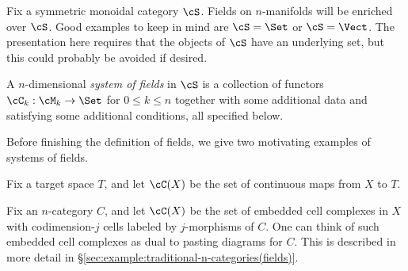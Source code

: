 Fix a symmetric monoidal category $\cS$.
Fields on $n$-manifolds will be enriched over $\cS$.
Good examples to keep in mind are $\cS = \Set$ or $\cS = \Vect$.
The presentation here requires that the objects of $\cS$ have an underlying set, 
but this could probably be avoided if desired.

A $n$-dimensional {\it system of fields} in $\cS$
is a collection of functors $\cC_k : \cM_k \to \Set$ for $0 \leq k \leq n$
together with some additional data and satisfying some additional conditions, all specified below.

Before finishing the definition of fields, we give two motivating examples of systems of fields.

\begin{example}
\label{ex:maps-to-a-space(fields)}
Fix a target space $T$, and let $\cC(X)$ be the set of continuous maps
from $X$ to $T$.
\end{example}

\begin{example}
\label{ex:traditional-n-categories(fields)}
Fix an $n$-category $C$, and let $\cC(X)$ be 
the set of embedded cell complexes in $X$ with codimension-$j$ cells labeled by
$j$-morphisms of $C$.
One can think of such embedded cell complexes as dual to pasting diagrams for $C$.
This is described in more detail in \S \ref{sec:example:traditional-n-categories(fields)}.
\end{example}

